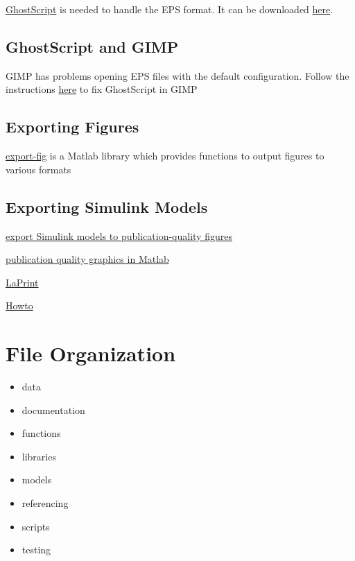 \documentclass[]{book}
\providecommand{\tightlist}{%
  \setlength{\itemsep}{0pt}\setlength{\parskip}{0pt}}
\begin{document}
\href{http://www.ghostscript.com/}{GhostScript} is needed to handle the
EPS format. It can be downloaded
\href{http://www.ghostscript.com/download/}{here}.

\subsection{GhostScript and GIMP}\label{ghostscript-and-gimp}

GIMP has problems opening EPS files with the default configuration.
Follow the instructions
\href{http://blog.tjitjing.com/index.php/2013/05/solution-error-open-eps-in-gimp-64-bit-with-ghostscript.html}{here}
to fix GhostScript in GIMP

\subsection{Exporting Figures}\label{exporting-figures}

\href{http://www.mathworks.com/matlabcentral/fileexchange/23629-export-fig}{export-fig}
is a Matlab library which provides functions to output figures to
various formats

\subsection{Exporting Simulink Models}\label{exporting-simulink-models}

\href{https://truongnghiem.wordpress.com/2010/07/07/export-simulink-models-to-publication-quality-figures/}{export
Simulink models to publication-quality figures}

\href{https://truongnghiem.wordpress.com/2010/05/28/more-on-publication-quality-graphics-in-matlab/}{publication
quality graphics in Matlab}

\href{http://www.mathworks.com/matlabcentral/fileexchange/4638-laprint}{LaPrint}

\href{http://www.mathworks.com/matlabcentral/answers/94951-how-do-i-save-my-simulink-model-as-a-tiff-or-jpeg-image}{Howto}

\section{File Organization}\label{file-organization}

\begin{itemize}
\tightlist
\item
  data
\item
  documentation
\item
  functions
\item
  libraries
\item
  models
\item
  referencing
\item
  scripts
\item
  testing
\end{itemize}
\end{document}
